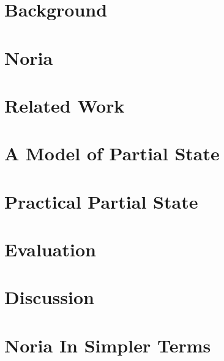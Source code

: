 \documentclass[fontsize=12pt,paper=letter,draft=true]{scrbook}
\begin{document}
\chapter{Background}

\chapter{Noria}

\chapter{Related Work}

\chapter{A Model of Partial State}

\chapter{Practical Partial State}

\chapter{Evaluation}



\chapter{Discussion}

\appendix
\chapter{Noria In Simpler Terms}

\backmatter

\begin{spacing}{1}
\printbibliography
\end{spacing}
\end{document}
